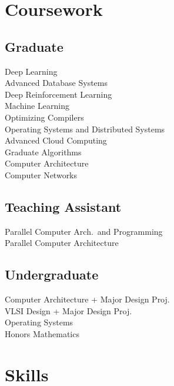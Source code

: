 \documentclass[]{resume}
\begin{document}
\begin{minipage}[t]{0.377\textwidth}

\section{Coursework}
\subsection{Graduate}
Deep Learning \\
Advanced Database Systems \\
Deep Reinforcement Learning \\
Machine Learning \\
Optimizing Compilers \\
Operating Systems and Distributed Systems \\
Advanced Cloud Computing \\
Graduate Algorithms \\
Computer Architecture \\
Computer Networks \\

\sectionsep%
\subsection{Teaching Assistant}
Parallel Computer Arch.\ and Programming \\
Parallel Computer Architecture
\sectionsep%

\subsection{Undergraduate}
Computer Architecture + Major Design Proj. \\
VLSI Design + Major Design Proj. \\
Operating Systems \\
Honors Mathematics


\section{Skills}

\end{minipage}
\end{document}
